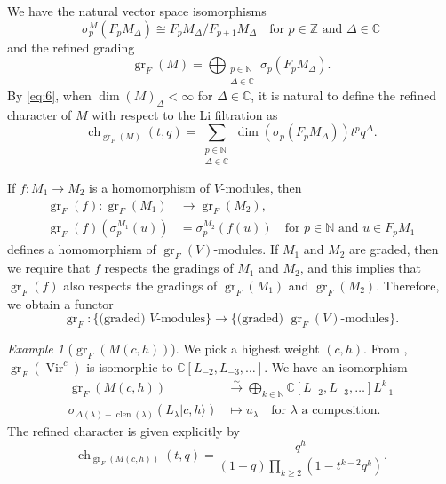 \documentclass[a4paper, 12pt, reqno]{amsart}
\theoremstyle{remark}
\newtheorem{example}[theorem]{Example}
\DeclareMathOperator{\Vir}{Vir}
\DeclareMathOperator{\ch}{ch}
\DeclareMathOperator{\clen}{clen}
\DeclareMathOperator{\gr}{gr}
\begin{document}
We have the natural vector space isomorphisms
\begin{equation*}
  \sigma^M_p(F_pM_{\Delta}) \cong F_pM_{\Delta}/F_{p + 1}M_{\Delta} \quad \text{for $p \in \mathbb{Z}$ and $\Delta \in \mathbb{C}$}
\end{equation*}
and the refined grading
\begin{equation}
  \label{eq:6}
  \gr_F(M) = \bigoplus_{\substack{p \in \mathbb{N} \\ \Delta \in \mathbb{C}}}\sigma_p(F_pM_{\Delta}).
\end{equation}
By \eqref{eq:6}, when $\dim(M)_{\Delta} < \infty$ for $\Delta \in \mathbb{C}$, it is natural to define the refined character of $M$ with respect to the Li filtration as
\begin{equation*}
  \ch_{\gr_F(M)}(t, q) = \sum_{\substack{p \in \mathbb{N} \\ \Delta \in \mathbb{C}}}\dim(\sigma_p(F_pM_{\Delta}))t^pq^{\Delta}.
\end{equation*}

If $f: M_1 \to M_2$ is a homomorphism of $V$-modules, then
\begin{align*}
  \gr_F(f): \gr_F(M_1) &\to \gr_F(M_2), \\
  \gr_F(f)(\sigma^{M_1}_p(u)) &= \sigma^{M_2}_p(f(u)) \quad \text{for $p \in \mathbb{N}$ and $u \in F_pM_1$}
\end{align*}
defines a homomorphism of $\gr_F(V)$-modules.
If $M_1$ and $M_2$ are graded, then we require that $f$ respects the gradings of $M_1$ and $M_2$, and this implies that $\gr_F(f)$ also respects the gradings of $\gr_F(M_1)$ and $\gr_F(M_2)$.
Therefore, we obtain a functor
\begin{equation*}
  \gr_F: \{\text{(graded) $V$-modules}\} \to \{\text{(graded) $\gr_F(V)$-modules}\}.
\end{equation*}

\begin{example}[$\gr_F(M(c, h))$]
  \label{exa:15}
  We pick a highest weight $(c, h)$.
  From , $\gr_F(\Vir^c)$ is isomorphic to $\mathbb{C}[L_{-2}, L_{-3}, \dots]$.
  We have an isomorphism
  \begin{align*}
    \gr_F(M(c, h)) &\xrightarrow{\sim} \bigoplus_{k \in \mathbb{N}}\mathbb{C}[L_{-2}, L_{-3}, \dots]L_{-1}^k \\
    \sigma_{\Delta(\lambda) - \clen(\lambda)}(L_{\lambda}|c, h\rangle) &\mapsto u_{\lambda} \quad \text{for $\lambda$ a composition}.
  \end{align*}
  The refined character is given explicitly by
  \begin{equation*}
    \ch_{\gr_F(M(c, h))}(t, q) = \frac{q^h}{(1 - q)\prod_{k \ge 2}(1 - t^{k - 2}q^k)}.
  \end{equation*}
\end{example}
\end{document}
